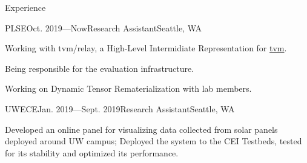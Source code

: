 \documentclass{resume}
\begin{document}

	\begin{rSection}{Experience}



		\begin{rSubsection}{PLSE}{Oct. 2019---Now}{Research Assistant}{Seattle, WA} 
			\item Working with tvm/relay, a High-Level Intermidiate Representation for \href{https://tvm.ai/}{tvm}.
			\item Being responsible for the evaluation infrastructure.
			\item Working on Dynamic Tensor Rematerialization with lab members.
		\end{rSubsection}
		\vspace{-5pt}


		\begin{rSubsection}{UWECE}{Jan. 2019---Sept. 2019}{Research Assistant}{Seattle, WA}
			\item Developed an online panel for visualizing data collected from solar panels deployed around UW campus; Deployed the system to the CEI Testbeds, tested for its stability and optimized its performance.
		\end{rSubsection}
		\vspace{-5pt}


	\end{rSection}
	\vspace{-5pt}
\end{document}
